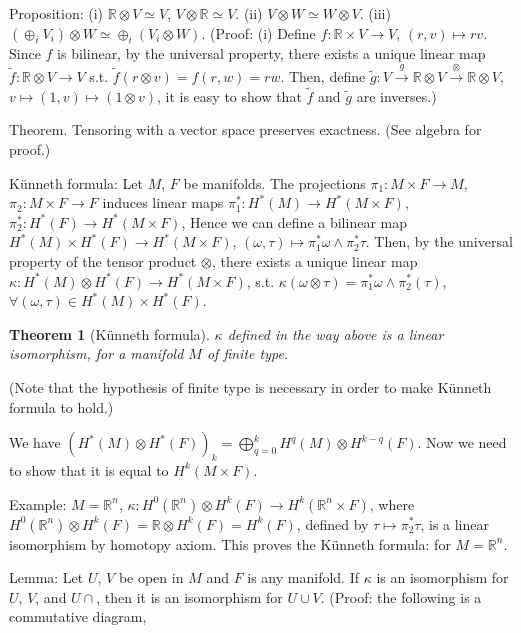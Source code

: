 \documentclass{article}
\theoremstyle{mystyle}
\newtheorem*{theorem*}{Theorem}
\theoremstyle{remark}
\numberwithin{equation}{section}
\begin{document}
Proposition: (i) $\mathbb{R}\otimes V \simeq V$, $V\otimes \mathbb{R}\simeq V$. (ii) $V\otimes W \simeq W\otimes V$. (iii) $(\oplus_i V_i)\otimes W \simeq \oplus_i (V_i\otimes W)$. (Proof: (i) Define $f\colon \mathbb{R}\times V\rightarrow V$, $(r,v)\mapsto rv$. Since $f$ is bilinear, by the universal property, there exists a unique linear map $\tilde{f}\colon \mathbb{R}\otimes V\rightarrow V$ s.t. $\tilde{f}(r\otimes v) = f(r,w)=rw$. Then, define $\tilde{g}\colon V\xrightarrow{g}\mathbb{R}\otimes V\xrightarrow{\otimes}\mathbb{R}\otimes V$, $v\mapsto (1,v) \mapsto (1\otimes v)$, it is easy to show that $\tilde{f}$ and $\tilde{g}$ are inverses.)


Theorem. Tensoring with a vector space preserves exactness. (See algebra for proof.)

Künneth formula: Let $M$, $F$ be manifolds. The projections $\pi_1\colon M\times F\rightarrow M$, $\pi_2\colon M\times F\rightarrow F$ induces linear maps $\pi_1^*\colon H^*(M)\rightarrow H^*(M\times F)$, $\pi_2^*\colon H^*(F)\rightarrow H^*(M\times F)$, Hence we can define a bilinear map
$H^*(M)\times H^*(F)\rightarrow H^*(M\times F)$, $(\omega,\tau)\mapsto \pi_1^*\omega \wedge \pi_2^*\tau$. Then, by the universal property of the tensor product $\otimes$, there exists a unique linear map $\kappa\colon H^*(M)\otimes H^*(F)\rightarrow H^*(M\times F)$, s.t. $\kappa(\omega\otimes \tau) = \pi_1^*\omega \wedge \pi_2^*(\tau)$, $\forall (\omega,\tau) \in H^*(M)\times H^*(F)$.  

\begin{theorem*}[Künneth formula] $\kappa$ defined in the way above is a linear isomorphism, for a manifold $M$ of finite type. 
\end{theorem*}
(Note that the hypothesis of finite type is necessary in order to make Künneth formula to hold.)

We have $(H^*(M)\otimes H^*(F))_k = \bigoplus_{q=0}^k
H^q(M)\otimes H^{k-q}(F)$. Now we need to show that it is equal to $H^k(M\times F)$. 

Example: $M = \mathbb{R}^n$, $\kappa\colon H^0(\mathbb{R}^n)\otimes H^k(F)\rightarrow H^k(\mathbb{R}^n\times F)$, where $H^0(\mathbb{R}^n)\otimes H^k(F)= \mathbb{R}\otimes H^k(F) = H^k(F)$, defined by $\tau\mapsto \pi_2^*\tau$, is a linear isomorphism by homotopy axiom. This proves the Künneth formula: for $M=\mathbb{R}^n$. 

Lemma: Let $U$, $V$ be open in $M$ and $F$ is any manifold. If $\kappa$ is an isomorphism for $U$, $V$, and $U\cap$, then it is an isomorphism for $U\cup V$. (Proof: the following is a commutative diagram,
\end{document}
